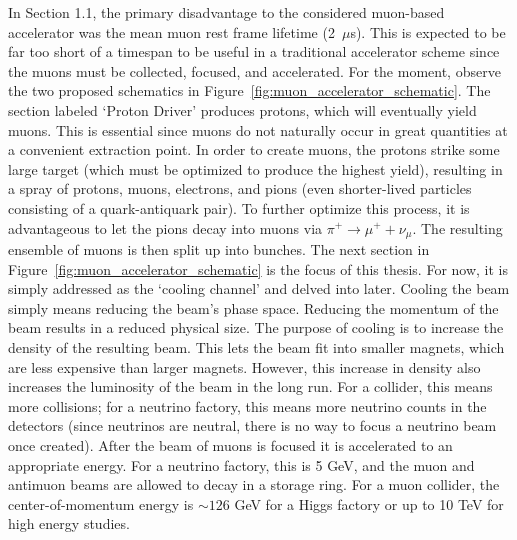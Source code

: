 In Section 1.1, the primary disadvantage to the considered muon-based accelerator was the mean muon rest frame lifetime (2~$\mu$s). This is expected to be far too short of a timespan to be useful in a traditional accelerator scheme since the muons must be collected, focused, and accelerated. For the moment, observe the two proposed schematics in Figure~\ref{fig:muon_accelerator_schematic}\cite{map}. The section labeled `Proton Driver' produces protons, which will eventually yield muons. This is essential since muons do not naturally occur in great quantities at a convenient extraction point. In order to create muons, the protons strike some large target (which must be optimized to produce the highest yield), resulting in a spray of protons, muons, electrons, and pions (even shorter-lived particles consisting of a quark-antiquark pair). To further optimize this process, it is advantageous to let the pions decay into muons via $\pi^+ \rightarrow \mu^+ + \nu_\mu$. The resulting ensemble of muons is then split up into bunches. The next section in Figure~\ref{fig:muon_accelerator_schematic} is the focus of this thesis. For now, it is simply addressed as the `cooling channel' and delved into later. Cooling the beam simply means reducing the beam's phase space. Reducing the momentum of the beam results in a reduced physical size. The purpose of cooling is to increase the density of the resulting beam. This lets the beam fit into smaller magnets, which are less expensive than larger magnets. However, this increase in density also increases the luminosity of the beam in the long run. For a collider, this means more collisions; for a neutrino factory, this means more neutrino counts in the detectors (since neutrinos are neutral, there is no way to focus a neutrino beam once created). After the beam of muons is focused it is accelerated to an appropriate energy. For a neutrino factory, this is 5 GeV, and the muon and antimuon beams are allowed to decay in a storage ring. For a muon collider, the center-of-momentum energy is $\sim 126$ GeV for a Higgs factory or up to 10 TeV for high energy studies.

